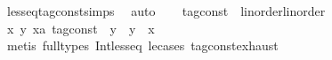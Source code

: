 \begin{isabellebody}
\ less{\isacharunderscore}eq{\isacharunderscore}tag{\isacharunderscore}const{\isachardot}simps\ \isamarkupfalse%
\ auto\isanewline
\ \ \isamarkupfalse%
%
\endisatagproof
{\isafoldproof}%
%
\isadelimproof
%
\endisadelimproof
\isanewline
{}\isamarkupfalse%
\isanewline
\isanewline
{}\isamarkupfalse%
\ tag{\isacharunderscore}const\ {\isacharcolon}{\isacharcolon}\ {\isacharparenleft}linorder{\isacharparenright}linorder\isanewline
{}\isanewline
\ \ \isamarkupfalse%
%
\isadelimproof
\ %
\endisadelimproof
%
\isatagproof
{}\isamarkupfalse%
\isanewline
\ \ \ \ \isamarkupfalse%
\ {\isacartoucheopen}{\isasymAnd}x\ y{\isachardot}\ {\isacharparenleft}x{\isacharcolon}{\isacharcolon}{\isacharprime}a\ tag{\isacharunderscore}const{\isacharparenright}\ {\isasymle}\ y\ {\isasymor}\ y\ {\isasymle}\ x{\isacartoucheclose}\isanewline
\ \ \ \ \ \ \isamarkupfalse%
\ {\isacharparenleft}metis\ {\isacharparenleft}full{\isacharunderscore}types{\isacharparenright}\ Int{\isacharunderscore}less{\isacharunderscore}eq\ le{\isacharunderscore}cases\ tag{\isacharunderscore}const{\isachardot}exhaust{\isacharparenright}\isanewline
\ \ \isamarkupfalse%
%
\endisatagproof
{\isafoldproof}%
%
\isadelimproof
%
\endisadelimproof
\isanewline
{}\isamarkupfalse%
\isanewline
%
\isadelimtheory
\isanewline
%
\endisadelimtheory
%
\isatagtheory
{}\isamarkupfalse%
%
\endisatagtheory
{\isafoldtheory}%
%
\isadelimtheory
%
\endisadelimtheory
%
\end{isabellebody}%
\endinput
